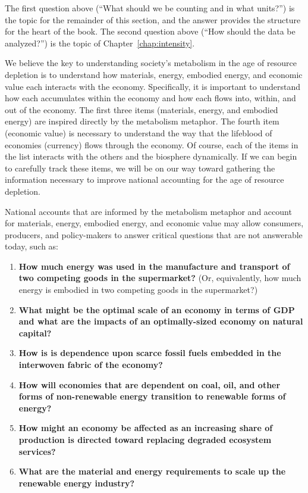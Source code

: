 The first question above (``What should we be counting and in what units?'') 
is the topic for the remainder of this section,
and the answer provides the structure for the heart of the book.
The second question above (``How should the data be analyzed?'')
is the topic of Chapter~\ref{chap:intensity}.

We believe the key to understanding society's metabolism
in the age of resource depletion is to understand how 
materials, energy, embodied energy, and economic value
each interacts with the economy.
Specifically, it is important to understand how each
accumulates within the economy and how each flows into, within, and out of the economy.
The first three items (materials, energy, and embodied energy) are
inspired directly by the metabolism metaphor.
The fourth item (economic value) is necessary to understand the way 
that the lifeblood of economies (currency) flows through the economy.
Of course, each of the items in the list interacts with the others 
and the biosphere dynamically.
If we can begin to carefully track these items, 
we will be on our way toward gathering the information necessary to 
improve national accounting for the age of resource depletion.

National accounts that are informed by the metabolism metaphor 
and account for materials, energy, embodied energy, and economic value
may allow consumers, producers,
and policy-makers to answer critical questions that are not
answerable today, such as:

\begin{enumerate}
	\item{\textbf{How much energy was used in the manufacture and transport
				of two competing goods in the supermarket?} 
				(Or, equivalently, how much energy is embodied 
				in two competing goods in the supermarket?)}
	\item{\textbf{What might be the optimal scale of an economy in terms of GDP 
				and what are the impacts of an optimally-sized economy on natural capital?}}
    \item{\textbf{How is is dependence upon scarce fossil fuels embedded 
    			in the interwoven fabric of the economy?}} 
    \item{\textbf{How will economies that are dependent on coal, oil, 
     			and other forms of non-renewable energy transition 
    			to renewable forms of energy?}}
	\item{\textbf{How might an economy be affected as an increasing share of production
				is directed toward replacing 
				degraded ecosystem services?}~\cite[p.~221]{kummel2011}​}
	\item{\textbf{What are the material and energy requirements to scale up 
				the renewable energy industry?}}
\end{enumerate}

